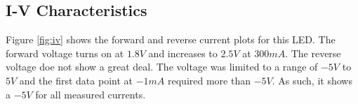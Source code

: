 \subsection{I-V Characteristics}
\label{sec:test:iv}

%



Figure \ref{fig:iv} shows the forward and reverse current plots for this LED. The forward voltage turns on at $1.8V$ and increases to $2.5V$ at $300mA$. The reverse voltage doe not show a great deal. The voltage was limited to a range of $-5V$ to $5V$ and the first data point at $-1mA$ required more than $-5V$. As such, it shows a $-5V$ for all measured currents.
